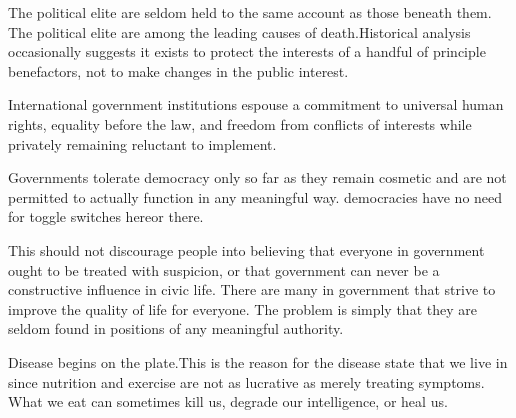 
The political elite are seldom held to the same account as those beneath them.
The political elite are among the leading causes of death. Historical analysis occasionally suggests it exists to protect the interests of a handful of principle benefactors,
\footnotecite[wilson2007]
\footnotecite[bowie2012]
\footnotecite[favel2008]
not to make changes in the public interest.

International government institutions espouse a commitment to universal human rights, equality before the law, and freedom from conflicts of interests while privately remaining reluctant to implement.

Governments tolerate democracy only so far as they remain cosmetic and are not permitted to actually function in any meaningful way. democracies have no need for toggle switches here or there. 

This should not discourage people into believing that everyone in government ought to be treated with suspicion, or that government can never be a constructive influence in civic life. There are many in government that strive to improve the quality of life for everyone. The problem is simply that they are seldom found in positions of any meaningful authority.


Disease begins on the plate. This is the reason for the disease state that we live in since nutrition and exercise are not as lucrative as merely treating symptoms. What we eat can sometimes kill us,
degrade our intelligence,
or heal us.
\footnotecite[cavusoglu2009]

